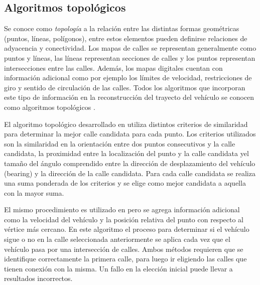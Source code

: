 \subsection{Algoritmos topológicos}

Se conoce como \emph{topología} a la relación entre las distintas formas geométricas (puntos, líneas, polígonos), entre estos elementos pueden definirse relaciones de adyacencia y conectividad. Los mapas de calles se representan generalmente como puntos y líneas, las líneas representan secciones de calles y los puntos representan intersecciones entre las calles. Además, los mapas digitales cuentan con información adicional como por ejemplo los límites de velocidad, restricciones de giro y sentido de circulación de las calles. Todos los algoritmos que incorporan este tipo de información en la reconstrucción del trayecto del vehículo se conocen como algoritmos topológicos \cite{quddus2007current}.

El algoritmo topológico desarrollado en \cite{greenfeld2002matching} utiliza distintos criterios de similaridad para determinar la mejor calle candidata para cada punto. Los criterios utilizados son la similaridad en la orientación entre dos puntos consecutivos y la calle candidata, la proximidad entre la localización del punto y la calle candidata yel tamaño del ángulo comprendido entre la dirección de desplazamiento del vehículo (bearing) y la dirección de la calle candidata. Para cada calle candidata se realiza una suma ponderada de los criterios y se elige como mejor candidata a aquella con la mayor suma.

El mismo procedimiento es utilizado en \cite{quddus2003general} pero se agrega información adicional como la velocidad del vehículo y la posición relativa del punto con respecto al vértice más cercano. En este algoritmo el proceso para determinar si el vehículo sigue o no en la calle seleccionada anteriormente se aplica cada vez que el vehículo pasa por una intersección de calles. Ambos métodos requieren que se identifique correctamente la primera calle, para luego ir eligiendo las calles que tienen conexión con la misma. Un fallo en la elección inicial puede llevar a resultados incorrectos.

